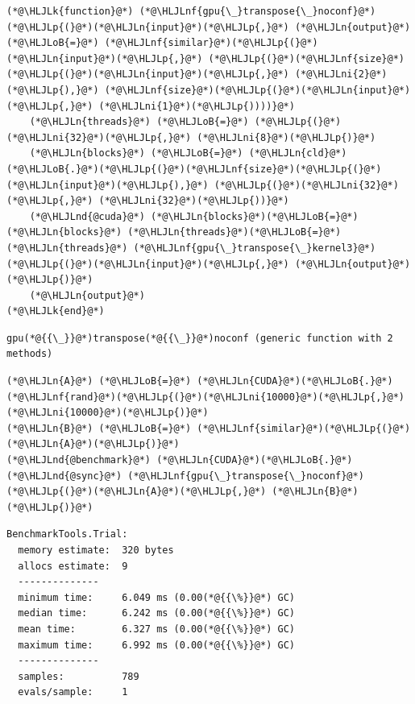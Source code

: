 \documentclass[12pt,a4paper]{article}
\newcommand{\HLJLk}[1]{\textcolor[RGB]{148,91,176}{\textbf{#1}}}
\newcommand{\HLJLn}[1]{#1}
\newcommand{\HLJLnd}[1]{\textcolor[RGB]{214,102,97}{#1}}
\newcommand{\HLJLnf}[1]{\textcolor[RGB]{66,102,213}{#1}}
\newcommand{\HLJLni}[1]{\textcolor[RGB]{59,151,46}{#1}}
\newcommand{\HLJLoB}[1]{\textcolor[RGB]{102,102,102}{\textbf{#1}}}
\newcommand{\HLJLp}[1]{#1}
\begin{document}
\begin{lstlisting}
(*@\HLJLk{function}@*) (*@\HLJLnf{gpu{\_}transpose{\_}noconf}@*)(*@\HLJLp{(}@*)(*@\HLJLn{input}@*)(*@\HLJLp{,}@*) (*@\HLJLn{output}@*) (*@\HLJLoB{=}@*) (*@\HLJLnf{similar}@*)(*@\HLJLp{(}@*)(*@\HLJLn{input}@*)(*@\HLJLp{,}@*) (*@\HLJLp{(}@*)(*@\HLJLnf{size}@*)(*@\HLJLp{(}@*)(*@\HLJLn{input}@*)(*@\HLJLp{,}@*) (*@\HLJLni{2}@*)(*@\HLJLp{),}@*) (*@\HLJLnf{size}@*)(*@\HLJLp{(}@*)(*@\HLJLn{input}@*)(*@\HLJLp{,}@*) (*@\HLJLni{1}@*)(*@\HLJLp{))))}@*)
    (*@\HLJLn{threads}@*) (*@\HLJLoB{=}@*) (*@\HLJLp{(}@*)(*@\HLJLni{32}@*)(*@\HLJLp{,}@*) (*@\HLJLni{8}@*)(*@\HLJLp{)}@*)
    (*@\HLJLn{blocks}@*) (*@\HLJLoB{=}@*) (*@\HLJLn{cld}@*)(*@\HLJLoB{.}@*)(*@\HLJLp{(}@*)(*@\HLJLnf{size}@*)(*@\HLJLp{(}@*)(*@\HLJLn{input}@*)(*@\HLJLp{),}@*) (*@\HLJLp{(}@*)(*@\HLJLni{32}@*)(*@\HLJLp{,}@*) (*@\HLJLni{32}@*)(*@\HLJLp{))}@*)
    (*@\HLJLnd{@cuda}@*) (*@\HLJLn{blocks}@*)(*@\HLJLoB{=}@*)(*@\HLJLn{blocks}@*) (*@\HLJLn{threads}@*)(*@\HLJLoB{=}@*)(*@\HLJLn{threads}@*) (*@\HLJLnf{gpu{\_}transpose{\_}kernel3}@*)(*@\HLJLp{(}@*)(*@\HLJLn{input}@*)(*@\HLJLp{,}@*) (*@\HLJLn{output}@*)(*@\HLJLp{)}@*)
    (*@\HLJLn{output}@*)
(*@\HLJLk{end}@*)
\end{lstlisting}

\begin{lstlisting}
gpu(*@{{\_}}@*)transpose(*@{{\_}}@*)noconf (generic function with 2 methods)
\end{lstlisting}


\begin{lstlisting}
(*@\HLJLn{A}@*) (*@\HLJLoB{=}@*) (*@\HLJLn{CUDA}@*)(*@\HLJLoB{.}@*)(*@\HLJLnf{rand}@*)(*@\HLJLp{(}@*)(*@\HLJLni{10000}@*)(*@\HLJLp{,}@*) (*@\HLJLni{10000}@*)(*@\HLJLp{)}@*)
(*@\HLJLn{B}@*) (*@\HLJLoB{=}@*) (*@\HLJLnf{similar}@*)(*@\HLJLp{(}@*)(*@\HLJLn{A}@*)(*@\HLJLp{)}@*)
(*@\HLJLnd{@benchmark}@*) (*@\HLJLn{CUDA}@*)(*@\HLJLoB{.}@*)(*@\HLJLnd{@sync}@*) (*@\HLJLnf{gpu{\_}transpose{\_}noconf}@*)(*@\HLJLp{(}@*)(*@\HLJLn{A}@*)(*@\HLJLp{,}@*) (*@\HLJLn{B}@*)(*@\HLJLp{)}@*)
\end{lstlisting}

\begin{lstlisting}
BenchmarkTools.Trial: 
  memory estimate:  320 bytes
  allocs estimate:  9
  --------------
  minimum time:     6.049 ms (0.00(*@{{\%}}@*) GC)
  median time:      6.242 ms (0.00(*@{{\%}}@*) GC)
  mean time:        6.327 ms (0.00(*@{{\%}}@*) GC)
  maximum time:     6.992 ms (0.00(*@{{\%}}@*) GC)
  --------------
  samples:          789
  evals/sample:     1
\end{lstlisting}
\end{document}
